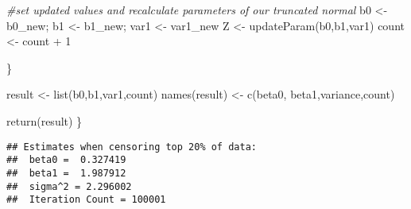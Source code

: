 \documentclass[
]{article}
\newenvironment{Shaded}{\begin{snugshade}}{\end{snugshade}}
\newcommand{\AttributeTok}[1]{\textcolor[rgb]{0.77,0.63,0.00}{#1}}
\newcommand{\CommentTok}[1]{\textcolor[rgb]{0.56,0.35,0.01}{\textit{#1}}}
\newcommand{\DecValTok}[1]{\textcolor[rgb]{0.00,0.00,0.81}{#1}}
\newcommand{\FloatTok}[1]{\textcolor[rgb]{0.00,0.00,0.81}{#1}}
\newcommand{\FunctionTok}[1]{\textcolor[rgb]{0.00,0.00,0.00}{#1}}
\newcommand{\NormalTok}[1]{#1}
\newcommand{\OtherTok}[1]{\textcolor[rgb]{0.56,0.35,0.01}{#1}}
\newcommand{\SpecialCharTok}[1]{\textcolor[rgb]{0.00,0.00,0.00}{#1}}
\newcommand{\StringTok}[1]{\textcolor[rgb]{0.31,0.60,0.02}{#1}}
\begin{document}
\begin{Shaded}
\begin{Highlighting}[]
    \CommentTok{\#set updated values and recalculate parameters of our truncated normal}
\NormalTok{    b0 }\OtherTok{\textless{}{-}}\NormalTok{ b0\_new; b1 }\OtherTok{\textless{}{-}}\NormalTok{ b1\_new; var1 }\OtherTok{\textless{}{-}}\NormalTok{ var1\_new}
\NormalTok{    Z }\OtherTok{\textless{}{-}} \FunctionTok{updateParam}\NormalTok{(b0,b1,var1)}
\NormalTok{    count }\OtherTok{\textless{}{-}}\NormalTok{ count }\SpecialCharTok{+} \DecValTok{1}
    
\NormalTok{  \}}
  
\NormalTok{  result }\OtherTok{\textless{}{-}} \FunctionTok{list}\NormalTok{(b0,b1,var1,count)}
  \FunctionTok{names}\NormalTok{(result) }\OtherTok{\textless{}{-}} \FunctionTok{c}\NormalTok{(}\StringTok{\textquotesingle{}beta0\textquotesingle{}}\NormalTok{, }\StringTok{\textquotesingle{}beta1\textquotesingle{}}\NormalTok{,}\StringTok{\textquotesingle{}variance\textquotesingle{}}\NormalTok{,}\StringTok{\textquotesingle{}count\textquotesingle{}}\NormalTok{)}
  
  \FunctionTok{return}\NormalTok{(result)}
\NormalTok{\}}
\end{Highlighting}
\end{Shaded}

\begin{Shaded}
\end{Shaded}

\begin{verbatim}
## Estimates when censoring top 20% of data: 
##  beta0 =  0.327419 
##  beta1 =  1.987912 
##  sigma^2 = 2.296002 
##  Iteration Count = 100001
\end{verbatim}
\end{document}
